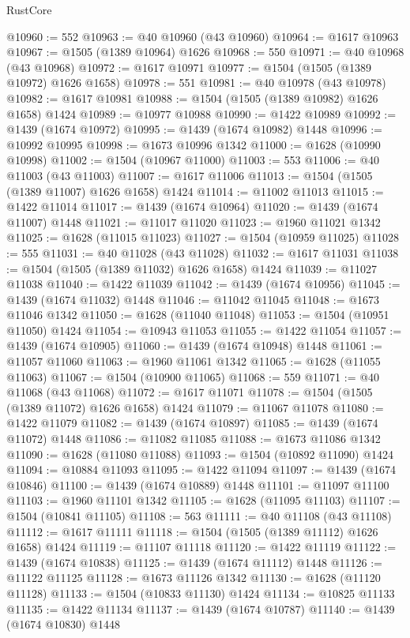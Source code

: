 \begin{lexlean}{RustCore}
\begin{coremodule}
@10960 := 552
@10963 := @40 @10960 (@43 @10960)
@10964 := @1617 @10963
@10967 := @1505 (@1389 @10964) @1626
@10968 := 550
@10971 := @40 @10968 (@43 @10968)
@10972 := @1617 @10971
@10977 := @1504 (@1505 (@1389 @10972) @1626 @1658)
@10978 := 551
@10981 := @40 @10978 (@43 @10978)
@10982 := @1617 @10981
@10988 := @1504 (@1505 (@1389 @10982) @1626 @1658) @1424
@10989 := @10977 @10988
@10990 := @1422 @10989
@10992 := @1439 (@1674 @10972)
@10995 := @1439 (@1674 @10982) @1448
@10996 := @10992 @10995
@10998 := @1673 @10996 @1342
@11000 := @1628 (@10990 @10998)
@11002 := @1504 (@10967 @11000)
@11003 := 553
@11006 := @40 @11003 (@43 @11003)
@11007 := @1617 @11006
@11013 := @1504 (@1505 (@1389 @11007) @1626 @1658) @1424
@11014 := @11002 @11013
@11015 := @1422 @11014
@11017 := @1439 (@1674 @10964)
@11020 := @1439 (@1674 @11007) @1448
@11021 := @11017 @11020
@11023 := @1960 @11021 @1342
@11025 := @1628 (@11015 @11023)
@11027 := @1504 (@10959 @11025)
@11028 := 555
@11031 := @40 @11028 (@43 @11028)
@11032 := @1617 @11031
@11038 := @1504 (@1505 (@1389 @11032) @1626 @1658) @1424
@11039 := @11027 @11038
@11040 := @1422 @11039
@11042 := @1439 (@1674 @10956)
@11045 := @1439 (@1674 @11032) @1448
@11046 := @11042 @11045
@11048 := @1673 @11046 @1342
@11050 := @1628 (@11040 @11048)
@11053 := @1504 (@10951 @11050) @1424
@11054 := @10943 @11053
@11055 := @1422 @11054
@11057 := @1439 (@1674 @10905)
@11060 := @1439 (@1674 @10948) @1448
@11061 := @11057 @11060
@11063 := @1960 @11061 @1342
@11065 := @1628 (@11055 @11063)
@11067 := @1504 (@10900 @11065)
@11068 := 559
@11071 := @40 @11068 (@43 @11068)
@11072 := @1617 @11071
@11078 := @1504 (@1505 (@1389 @11072) @1626 @1658) @1424
@11079 := @11067 @11078
@11080 := @1422 @11079
@11082 := @1439 (@1674 @10897)
@11085 := @1439 (@1674 @11072) @1448
@11086 := @11082 @11085
@11088 := @1673 @11086 @1342
@11090 := @1628 (@11080 @11088)
@11093 := @1504 (@10892 @11090) @1424
@11094 := @10884 @11093
@11095 := @1422 @11094
@11097 := @1439 (@1674 @10846)
@11100 := @1439 (@1674 @10889) @1448
@11101 := @11097 @11100
@11103 := @1960 @11101 @1342
@11105 := @1628 (@11095 @11103)
@11107 := @1504 (@10841 @11105)
@11108 := 563
@11111 := @40 @11108 (@43 @11108)
@11112 := @1617 @11111
@11118 := @1504 (@1505 (@1389 @11112) @1626 @1658) @1424
@11119 := @11107 @11118
@11120 := @1422 @11119
@11122 := @1439 (@1674 @10838)
@11125 := @1439 (@1674 @11112) @1448
@11126 := @11122 @11125
@11128 := @1673 @11126 @1342
@11130 := @1628 (@11120 @11128)
@11133 := @1504 (@10833 @11130) @1424
@11134 := @10825 @11133
@11135 := @1422 @11134
@11137 := @1439 (@1674 @10787)
@11140 := @1439 (@1674 @10830) @1448

\end{coremodule}
\end{lexlean}

